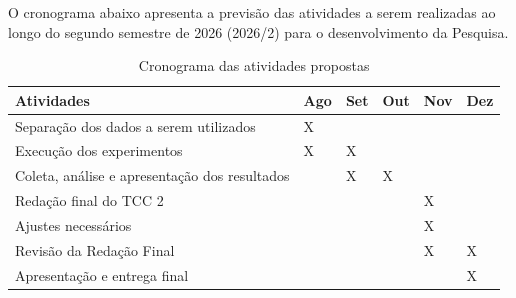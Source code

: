 O cronograma abaixo apresenta a previsão das atividades a serem realizadas ao longo
do segundo semestre de 2026 (2026/2) para o desenvolvimento da Pesquisa.

\begin{table}[H]
\centering
\begin{tabular}{  |>{\centering\arraybackslash}p{7cm}|>{\centering\arraybackslash}p{1cm}|>{\centering\arraybackslash}p{1cm}|>{\centering\arraybackslash}p{1cm}|>{\centering\arraybackslash}p{1cm}|>{\centering\arraybackslash}p{1cm}| }
\hline
\textbf{Atividades} & \textbf{Ago} & \textbf{Set} & \textbf{Out} & \textbf{Nov} & \textbf{Dez}\\
\hline
Separação dos dados a serem utilizados & X &  &  &  &  \\
\hline
Execução dos experimentos & X & X &  &  &  \\
\hline
Coleta, análise e apresentação dos resultados & & X & X  &  &  \\
\hline
Redação final do TCC 2 & &  &   & X &  \\
\hline
Ajustes necessários  & &  &   & X &  \\
\hline
Revisão da Redação Final & &  &   & X & X  \\
\hline
Apresentação e entrega final  & &  &   &  & X  \\
\hline
\end{tabular}
\caption{Cronograma das atividades propostas}
\label{tab:PHP}
\end{table}


